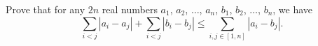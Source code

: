 Prove that for any $2n$ real numbers $a_{1}$, $a_{2}$, \(\dots\), $a_{n}$, $b_{1}$, $b_{2}$, \(\dots\), $b_{n}$,
we have \[\sum_{i < j}{\left|a_{i}-a_{j}\right|}+\sum_{i < j}{\left|b_{i}-b_{j}\right|}\leq\sum_{i,j\in\left[1,n\right]}{\left|a_{i}-b_{j}\right|}.\]
